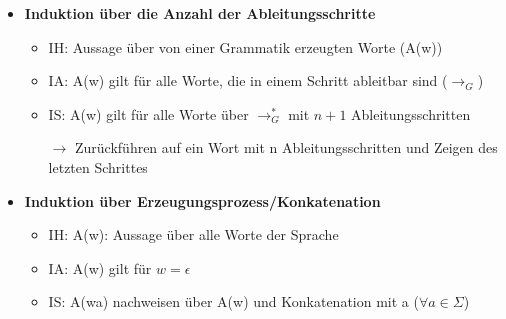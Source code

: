 \documentclass[11pt,a4paper]{article}
\begin{document}
\begin{itemize}
\begin{itemize}
	\item \textbf{Induktion über die Anzahl der Ableitungsschritte}
		\begin{itemize}
		\item IH: Aussage über von einer Grammatik erzeugten Worte (A(w))
		\item IA: A(w) gilt für alle Worte, die in einem Schritt ableitbar sind ($\rightarrow_G$)
		\item IS: A(w) gilt für alle Worte über $\rightarrow^*_G$ mit $n+1$ Ableitungsschritten
		\item[$\rightarrow$] Zurückführen auf ein Wort mit n Ableitungsschritten und Zeigen des letzten Schrittes
		\end{itemize}
		
	\item \textbf{Induktion über Erzeugungsprozess/Konkatenation}
		\begin{itemize}
		\item IH: A(w): Aussage über alle Worte der Sprache
		\item IA: A(w) gilt für $w = \epsilon$
		\item IS: A(wa) nachweisen über A(w) und Konkatenation mit a ($\forall a \in \Sigma$)
		\end{itemize}
	
	\end{itemize}
	
\pagebreak	
	

\end{itemize}
\end{document}
